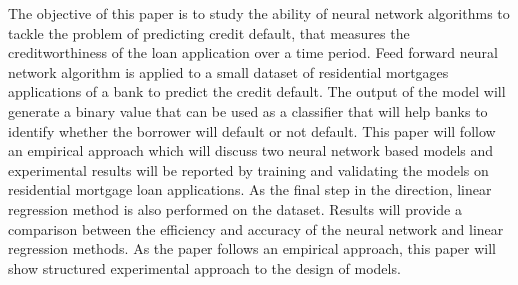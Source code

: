 \documentclass{article}[]
\begin{document}
The objective of this paper is to study the ability of neural network algorithms to tackle the problem of predicting credit default, that measures the creditworthiness of the loan application over a time period. Feed forward neural network algorithm is applied to a small dataset of residential mortgages applications of a bank to predict the credit default. The output of the model will generate a binary value that can be used as a classifier that will help banks to identify whether the borrower will default or not default. This paper will follow an empirical approach which will discuss two neural network based models and experimental results will be reported by training and validating the models on residential mortgage loan applications. As the final step in the direction, linear regression method is also performed on the dataset. Results will provide a comparison between the efficiency and accuracy of the neural network and linear regression methods. As the paper follows an empirical approach, this paper will show structured experimental approach to the design of models. 
\end{document}
